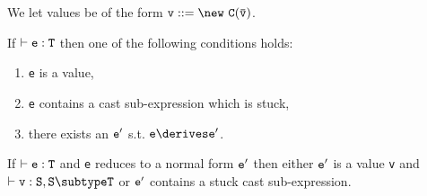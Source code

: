 We let values be of the form $\tt v ::= \new\ C(\bar{\tt v})$. 
\begin{theorem}[Progress]
If $\vdash {\tt e:T}$ then one of the following conditions holds:
\begin{enumerate}
\item {\tt e} is a value,
\item {\tt e} contains a cast sub-expression which is stuck,
\item there exists an $\tt e'$ s.t. $\tt e\derives e'$.
\end{enumerate}
\end{theorem}

\begin{theorem}
If $\vdash {\tt e:T}$ and {\tt e} reduces to a normal form ${\tt e'}$ then
either $\tt e'$ is a value {\tt v} and $\vdash {\tt v:S},{\tt S\subtype T}$ or
${\tt e'}$ contains  a stuck cast sub-expression.
\end{theorem}




